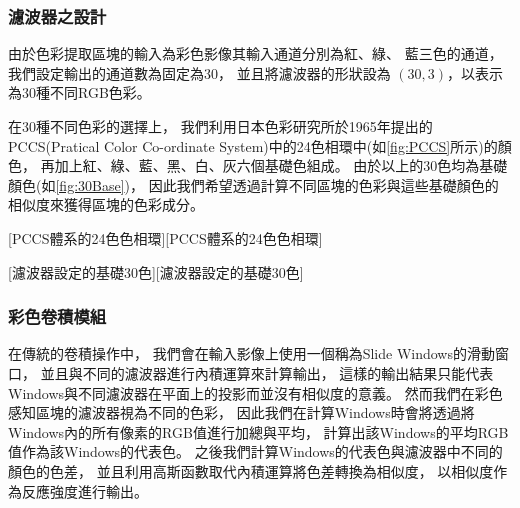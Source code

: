 \documentclass[class=NCU_thesis, crop=false]{standalone}
\begin{document}
		\subsubsection{濾波器之設計}
			由於色彩提取區塊的輸入為彩色影像其輸入通道分別為紅、綠、 藍三色的通道，
			我們設定輸出的通道數為固定為30，
			並且將濾波器的形狀設為 $\left(30 , 3\right)$，以表示為30種不同RGB色彩。

			在30種不同色彩的選擇上，
			我們利用日本色彩研究所於1965年提出的PCCS(Pratical Color Co-ordinate System)中的24色相環中(如\cref{fig:PCCS}所示)的顏色，
			再加上紅、綠、藍、黑、白、灰六個基礎色組成。
			由於以上的30色均為基礎顏色(如\cref{fig:30Base})，
			因此我們希望透過計算不同區塊的色彩與這些基礎顏色的相似度來獲得區塊的色彩成分。

			[PCCS體系的24色色相環\cite{PCCScite}][PCCS體系的24色色相環]

			[濾波器設定的基礎30色][濾波器設定的基礎30色]

		\subsubsection{彩色卷積模組}
			在傳統的卷積操作中，
			我們會在輸入影像上使用一個稱為Slide Windows的滑動窗口，
			並且與不同的濾波器進行內積運算來計算輸出，
			這樣的輸出結果只能代表Windows與不同濾波器在平面上的投影而並沒有相似度的意義。
			然而我們在彩色感知區塊的濾波器視為不同的色彩，
			因此我們在計算Windows時會將透過將Windows內的所有像素的RGB值進行加總與平均，
			計算出該Windows的平均RGB值作為該Windows的代表色。
			之後我們計算Windows的代表色與濾波器中不同的顏色的色差，
			並且利用高斯函數取代內積運算將色差轉換為相似度，
			以相似度作為反應強度進行輸出。
\end{document}
